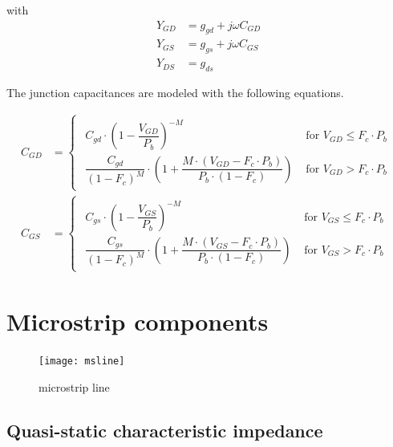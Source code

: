 \documentclass[10pt]{report}
\begin{document}
with
\begin{align}
Y_{GD} &= g_{gd} + j\omega C_{GD}\\
Y_{GS} &= g_{gs} + j\omega C_{GS}\\
Y_{DS} &= g_{ds}
\end{align}

The junction capacitances are modeled with the following equations.

\begin{align}
C_{GD} &= 
\begin{cases}
\begin{array}{ll}
C_{gd}\cdot \left(1 - \dfrac{V_{GD}}{P_{b}}\right)^{-M} & \text{ for } V_{GD} \le F_{c}\cdot P_{b}\\
\dfrac{C_{gd}}{\left(1 - F_{c}\right)^{M}}\cdot \left(1 + \dfrac{M\cdot \left(V_{GD} - F_{c}\cdot P_{b}\right)}{P_{b}\cdot \left(1 - F_{c}\right)}\right) & \text{ for } V_{GD} > F_{c}\cdot P_{b}
\end{array}
\end{cases}\\
C_{GS} &= 
\begin{cases}
\begin{array}{ll}
C_{gs}\cdot \left(1 - \dfrac{V_{GS}}{P_{b}}\right)^{-M} & \text{ for } V_{GS} \le F_{c}\cdot P_{b}\\
\dfrac{C_{gs}}{\left(1 - F_{c}\right)^{M}}\cdot \left(1 + \dfrac{M\cdot \left(V_{GS} - F_{c}\cdot P_{b}\right)}{P_{b}\cdot \left(1 - F_{c}\right)}\right) & \text{ for } V_{GS} > F_{c}\cdot P_{b}
\end{array}
\end{cases}
\end{align}

\chapter{Microstrip components}

\begin{figure}[ht]
\begin{center}
\texttt{[image: msline]}
\end{center}
\caption{microstrip line}
\label{fig:MSline}
\end{figure}
\FloatBarrier

\section{Quasi-static characteristic impedance}
\end{document}
